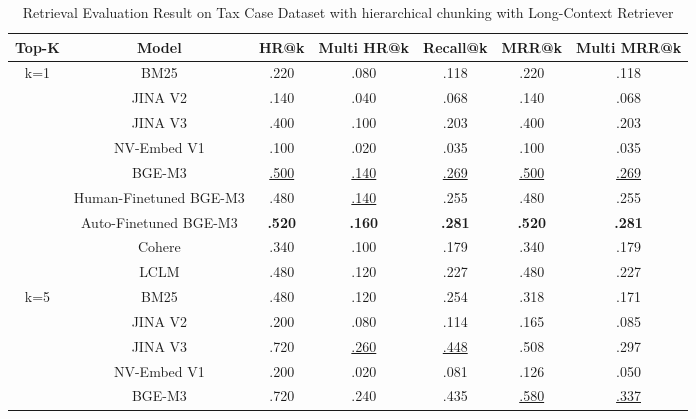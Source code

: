 \begin{table}[ht]
\centering
\caption{Retrieval Evaluation Result on Tax Case Dataset with hierarchical chunking with Long-Context Retriever}
\renewcommand{\arraystretch}{1.5} %
\label{table: retrieval_tax_lclm}
\begin{tabular}{@{}c|cccccc@{}}
\toprule
Top-K & Model                  & HR@k          & Multi HR@k    & Recall@k      & MRR@k         & Multi MRR@k   \\ \midrule
k=1   & BM25                   & .220          & .080          & .118          & .220          & .118          \\
      & JINA V2                & .140          & .040          & .068          & .140          & .068          \\
      & JINA V3                & .400          & .100          & .203          & .400          & .203          \\
      & NV-Embed V1            & .100          & .020          & .035          & .100          & .035          \\
      & BGE-M3                 & \underline{.500}    & \underline{.140}    & \underline{.269}    & \underline{.500}    & \underline{.269}    \\
      & Human-Finetuned BGE-M3 & .480          & \underline{.140}    & .255          & .480          & .255          \\
      & Auto-Finetuned BGE-M3  & \textbf{.520} & \textbf{.160} & \textbf{.281} & \textbf{.520} & \textbf{.281} \\
      & Cohere                 & .340          & .100          & .179          & .340          & .179          \\
      & LCLM                   & .480          & .120          & .227          & .480          & .227          \\ \midrule
k=5   & BM25                   & .480          & .120          & .254          & .318          & .171          \\
      & JINA V2                & .200          & .080          & .114          & .165          & .085          \\
      & JINA V3                & .720          & \underline{.260}    & \underline{.448}    & .508          & .297          \\
      & NV-Embed V1            & .200          & .020          & .081          & .126          & .050          \\
      & BGE-M3                 & .720          & .240          & .435          & \underline{.580}    & \underline{.337}    \\

\end{tabular}
\end{table}
